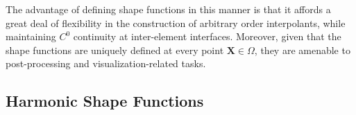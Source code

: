 	
	
	
	
	The advantage of defining shape functions in this manner is that it affords a great deal of flexibility in the construction of arbitrary order interpolants, while maintaining $C^0$ continuity at inter-element interfaces. Moreover, given that the shape functions are uniquely defined at every point $\mathbf{X} \in \Omega$, they are amenable to post-processing and visualization-related tasks.
	

\subsection*{Harmonic Shape Functions}


